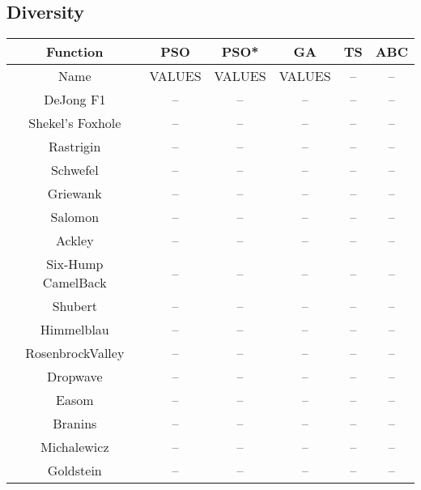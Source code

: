 \subsection{Diversity}
\begin{center}
	\begin{tabular}{| c | c | c | c | c | c |}
	\hline
	Function & PSO & PSO* & GA & TS & ABC\\  \hline
	Name & VALUES & VALUES & VALUES\cite{} & -- & --\\ \hline
	DeJong F1 & -- & -- & -- & -- & --\\ \hline
	Shekel's Foxhole & -- & -- & -- & -- & --\\ \hline
	Rastrigin & -- & -- & -- & -- & --\\ \hline
	Schwefel & -- & -- & -- & -- & --\\ \hline
	Griewank & -- & -- & -- & -- & --\\ \hline
	Salomon & -- & -- & -- & -- & --\\ \hline
	Ackley & -- & -- & -- & -- & --\\ \hline
	Six-Hump CamelBack & -- & -- & -- & -- & --\\ \hline
	Shubert & -- & -- & -- & -- & --\\ \hline
	Himmelblau & -- & -- & -- & -- & --\\ \hline
	RosenbrockValley & -- & -- & -- & -- & --\\ \hline
	Dropwave & -- & -- & -- & -- & --\\ \hline
	Easom & -- & -- & -- & -- & --\\ \hline
	Branins & -- & -- & -- & -- & --\\ \hline
	Michalewicz & -- & -- & -- & -- & --\\ \hline
	Goldstein & -- & -- & -- & -- & --\\ \hline
	\end{tabular}
\end{center}
